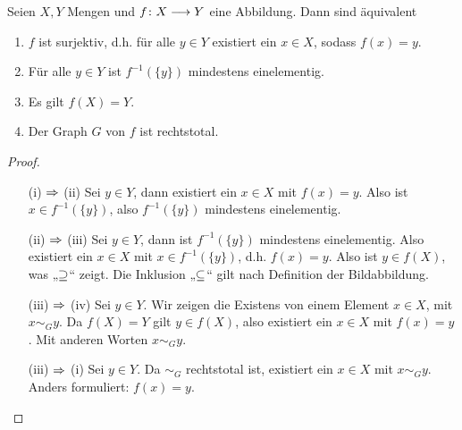 
\begin{bem}

  Seien $X, Y$ Mengen und $f\colon X \longrightarrow Y$ eine Abbildung. Dann sind
  äquivalent

  \begin{enumerate}

    \item $f$ ist surjektiv, d.h. für alle $y\in Y$ existiert ein $x\in
      X$, sodass $f(x)=y$.

    \item Für alle $y\in Y$ ist $f^{-1}(\{ y \})$ mindestens
      einelementig.

    \item Es gilt $f(X) = Y$.

    \item Der Graph $G$ von $f$ ist rechtstotal.

  \end{enumerate}

  \begin{proof}
    \quad

    \begin{itemize}
    
      \item[\tiny{(i) $\Rightarrow$ (ii)}] 
        Sei $y\in Y$, dann existiert ein $x\in X$ mit $f(x)=y$. Also ist
        $x\in f^{-1}(\{ y \})$, also $f^{-1}(\{ y \})$ mindestens
        einelementig.

      \item[\tiny{(ii) $\Rightarrow$ (iii)}] Sei $y\in Y$, dann ist $f^{-1}(\{ y
        \})$ mindestens einelementig. Also existiert ein $x\in X$ mit $x\in
        f^{-1}(\{ y \})$, d.h. $f(x) = y$. Also ist $y \in f(X)$, was
        „$\supseteq$“ zeigt. Die Inklusion „$\subseteq$“ gilt nach Definition der
        Bildabbildung.

      \item[\tiny{(iii) $\Rightarrow$ (iv)}]
        Sei $y\in Y$. Wir zeigen die Existens von einem Element $x\in X$,
        mit $x\sim_{G} y$. Da $f(X) = Y$ gilt $y\in f(X)$, also existiert
        ein $x\in X$ mit $f(x)= y$. Mit anderen Worten $x\sim_{G}y$.

      \item[\tiny{(iii) $\Rightarrow$ (i)}] 
        Sei $y\in Y$. Da $\sim_{G}$ rechtstotal ist, existiert ein $x\in X$
        mit $x\sim_{G} y$. Anders formuliert: $f(x) = y$.

    \end{itemize}
    
  \end{proof}

\end{bem}

